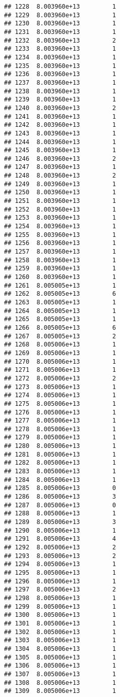 \documentclass[
]{article}
\begin{document}
\begin{verbatim}
## 1228  8.003960e+13         1
## 1229  8.003960e+13         1
## 1230  8.003960e+13         1
## 1231  8.003960e+13         1
## 1232  8.003960e+13         2
## 1233  8.003960e+13         1
## 1234  8.003960e+13         1
## 1235  8.003960e+13         1
## 1236  8.003960e+13         1
## 1237  8.003960e+13         1
## 1238  8.003960e+13         1
## 1239  8.003960e+13         1
## 1240  8.003960e+13         2
## 1241  8.003960e+13         1
## 1242  8.003960e+13         1
## 1243  8.003960e+13         1
## 1244  8.003960e+13         1
## 1245  8.003960e+13         1
## 1246  8.003960e+13         2
## 1247  8.003960e+13         1
## 1248  8.003960e+13         2
## 1249  8.003960e+13         1
## 1250  8.003960e+13         1
## 1251  8.003960e+13         1
## 1252  8.003960e+13         1
## 1253  8.003960e+13         1
## 1254  8.003960e+13         1
## 1255  8.003960e+13         1
## 1256  8.003960e+13         1
## 1257  8.003960e+13         1
## 1258  8.003960e+13         1
## 1259  8.003960e+13         1
## 1260  8.003960e+13         1
## 1261  8.005005e+13         1
## 1262  8.005005e+13         6
## 1263  8.005005e+13         1
## 1264  8.005005e+13         1
## 1265  8.005005e+13         1
## 1266  8.005005e+13         6
## 1267  8.005005e+13         2
## 1268  8.005006e+13         1
## 1269  8.005006e+13         1
## 1270  8.005006e+13         1
## 1271  8.005006e+13         1
## 1272  8.005006e+13         2
## 1273  8.005006e+13         1
## 1274  8.005006e+13         1
## 1275  8.005006e+13         1
## 1276  8.005006e+13         1
## 1277  8.005006e+13         1
## 1278  8.005006e+13         1
## 1279  8.005006e+13         1
## 1280  8.005006e+13         1
## 1281  8.005006e+13         1
## 1282  8.005006e+13         1
## 1283  8.005006e+13         1
## 1284  8.005006e+13         1
## 1285  8.005006e+13         0
## 1286  8.005006e+13         3
## 1287  8.005006e+13         0
## 1288  8.005006e+13         1
## 1289  8.005006e+13         3
## 1290  8.005006e+13         1
## 1291  8.005006e+13         4
## 1292  8.005006e+13         2
## 1293  8.005006e+13         2
## 1294  8.005006e+13         1
## 1295  8.005006e+13         1
## 1296  8.005006e+13         1
## 1297  8.005006e+13         2
## 1298  8.005006e+13         1
## 1299  8.005006e+13         1
## 1300  8.005006e+13         1
## 1301  8.005006e+13         1
## 1302  8.005006e+13         1
## 1303  8.005006e+13         1
## 1304  8.005006e+13         1
## 1305  8.005006e+13         1
## 1306  8.005006e+13         1
## 1307  8.005006e+13         1
## 1308  8.005006e+13         1
## 1309  8.005006e+13         1

\end{verbatim}
\end{document}
